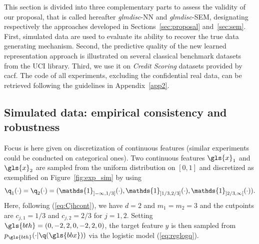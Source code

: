This section is divided into three complementary parts to assess the validity of our proposal, that is called hereafter \textit{glmdisc}-NN and \textit{glmdisc}-SEM, designating respectively the approaches developed in Sections~\ref{sec:proposal} and~\ref{sec:sem}. First, simulated data are used to evaluate its ability to recover the true data generating mechanism. Second, the predictive quality of the new learned representation approach is illustrated on several classical benchmark datasets from the UCI library. Third, we use it on \textit{Credit Scoring} datasets provided by \gls{cacf}. The code of all experiments, excluding the confidential real data, can be retrieved following the guidelines in Appendix~\ref{app2}.


\subsection{Simulated data: empirical consistency and robustness}

Focus is here given on discretization of continuous features (similar experiments could be conducted on categorical ones). Two continuous features $\gls{x}_1$ and $\gls{x}_2$ are sampled from the uniform distribution on $[0,1]$ and discretized as exemplified on Figure~\ref{fig:exp_sim} by using
\[\q_1(\cdot)=\q_2(\cdot) = (\mathds{1}_{]-\infty,1/3]}(\cdot),\mathds{1}_{]1/3,2/3]}(\cdot),\mathds{1}_{]2/3,\infty[}(\cdot)).\]
Here, following (\ref{eq:Cjhcont}), we have $d=2$ and $m_1=m_2=3$ and the cutpoints are $c_{j,1}=1/3$ and $c_{j,2}=2/3$ for $j=1,2$. Setting $\gls{bth}=(0,-2,2,0,-2,2,0)$, the target feature $y$ is then sampled from $p_{\gls{bth}}(\cdot | \q(\gls{bbx}))$ via the logistic model (\ref{eq:reglogq}).

